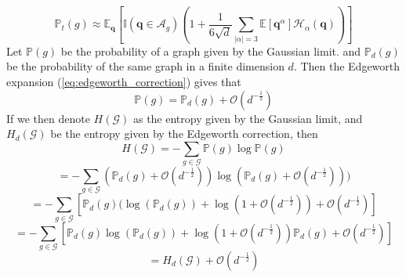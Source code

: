\documentclass{article}
\newcommand{\graph}{\mathcal{G}}
\newcommand{\bigO}[1]{\mathcal{O}\left(#1\right)}
\newcommand{\prob}[1]{\mathbb{P}\left(#1\right)}
\begin{document}
\begin{equation}
    \label{eq:edgeworth_correction}
    \mathbb{P}_t(g) \approx \mathbb{E}_{\boldsymbol{q}}\left[\mathbb{I}(\boldsymbol{q} \in \mathcal{A}_g)\left(1 + \frac{1}{6\sqrt{d}}\sum_{|\alpha| = 3} \mathbb{E}[\boldsymbol{q}^{\alpha}]\mathcal{H}_{\alpha}(\boldsymbol{q})\right)\right]
\end{equation}
Let $\mathbb{P}(g)$ be the probability of a graph given by the Gaussian limit. and $\mathbb{P}_d(g)$ be the probability of the same graph in a finite dimension $d$. Then the Edgeworth expansion (\ref{eq:edgeworth_correction}) gives that
\begin{equation}
    \mathbb{P}(g) = \mathbb{P}_d(g) + \bigO{d^{-\frac{1}{2}}}
\end{equation}
If we then denote $H(\graph)$ as the entropy given by the Gaussian limit, and $H_d(\graph)$ be the entropy given by the Edgeworth correction, then
\begin{equation}
    H(\graph) = -\sum_{g\in\graph} \prob{g}\log \prob{g}
\end{equation}
\begin{equation}
    = - \sum_{g\in \graph}(\mathbb{P}_d(g) + \bigO{d^{-\frac{1}{2}}})\log \left(\mathbb{P}_d(g) + \bigO{d^{-\frac{1}{2}}}\right))
\end{equation}
\begin{equation}
    = -\sum_{g \in \graph} \left[\mathbb{P}_d(g)(\log (\mathbb{P}_d(g)) + \log \left(1+\bigO{d^{-\frac{1}{2}}}\right) + \bigO{d^{-\frac{1}{2}}}\right]
\end{equation}
\begin{equation}
    = -\sum_{g\in\graph} \left[\mathbb{P}_d(g) \log(\mathbb{P}_d(g)) + \log\left(1+\bigO{d^{-\frac{1}{2}}}\right)\mathbb{P}_d(g) + \bigO{d^{-\frac{1}{2}}}\right]
\end{equation}
\begin{equation}
    \label{eq:entropy_scaling_in_d}
    = H_d(\graph) + \bigO{d^{-\frac{1}{2}}}
\end{equation}
\end{document}
